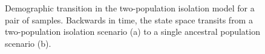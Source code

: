 \documentclass[graybox]{svmult}
\begin{document}
\begin{figure}[h]
\caption{Demographic transition in the two-population isolation model for a pair of samples.  Backwards in time, the state space transits from a two-population isolation scenario (a) to a single ancestral population scenario (b).}
\label{fig:ctmc-iso}
\end{figure}
\end{document}
